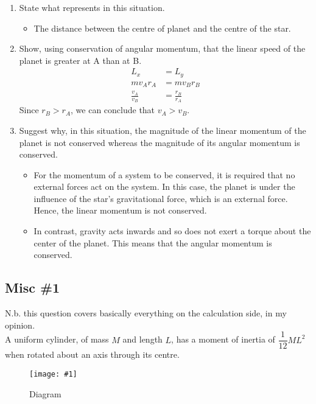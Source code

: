 \documentclass[a4paper,12pt]{article}
\newcommand{\lb}{\\[8pt]}
\newcommand{\img}[4]{\begin{center}
  \begin{figure}[H]
    \centering
    \texttt{[image: \#1]}
    \caption{#3}
    \label{fig:#4}
  \end{figure}
\end{center}}
\begin{document}
\begin{enumerate}[label=(\alph*)]
  \item State what represents in this situation.
        \begin{itemize}
          \item The distance between the centre of planet and the centre of the star.

        \end{itemize}
  \item Show, using conservation of angular momentum, that the linear speed of the planet is greater at A than at B.
        \begin{align*}
          L_x             & = L_y             \\
          mv_Ar_A         & = mv_Br_B         \\
          \frac{v_A}{v_B} & = \frac{r_B}{r_A}
        \end{align*}
        Since $r_B > r_A$, we can conclude that $v_A > v_B$.
  \item Suggest why, in this situation, the magnitude of the linear momentum of the planet is not conserved whereas the magnitude of its angular momentum is conserved.
        \begin{itemize}
          \item For the momentum of a system to be conserved, it is required that no external forces act on the system. In this case, the planet is under the influence of the star's gravitational force, which is an external force. Hence, the linear momentum is not conserved.
          \item In contrast, gravity acts inwards and so does not exert a torque about the center of the planet. This means that the angular momentum is conserved.
        \end{itemize}
\end{enumerate}

\pagebreak

\subsection{Misc \#1}

N.b. this question covers basically everything on the calculation side, in my opinion.\lb
A uniform cylinder, of mass $M$ and length $L$, has a moment of inertia of $\dfrac{1}{12}ML^2$ when rotated about an axis through its centre.
\img{ex/3.png}{0.5}{Diagram}{cylinder}
\end{document}
